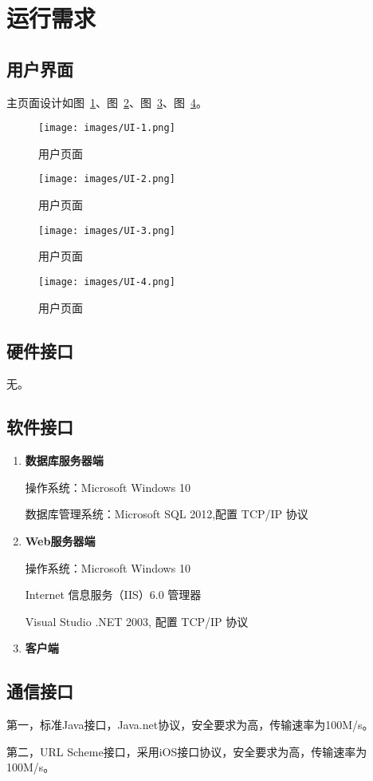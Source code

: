 \section{运行需求}
\subsection{用户界面}
主页面设计如图~\ref{fig:UI1}、图~\ref{fig:UI2}、图~\ref{fig:UI3}、图~\ref{fig:UI4}。

\begin{figure}[H]
 \centering
 \texttt{[image: images/UI-1.png]}
 \caption{
    用户页面
  }
 \label{fig:UI1}
 \vspace{-\medskipamount}
\end{figure}

\begin{figure}[H]
 \centering
 \texttt{[image: images/UI-2.png]}
 \caption{
    用户页面
  }
 \label{fig:UI2}
 \vspace{-\medskipamount}
\end{figure}

\begin{figure}[H]
 \centering
 \texttt{[image: images/UI-3.png]}
 \caption{
    用户页面
  }
 \label{fig:UI3}
 \vspace{-\medskipamount}
\end{figure}

\begin{figure}[H]
 \centering
 \texttt{[image: images/UI-4.png]}
 \caption{
    用户页面
  }
 \label{fig:UI4}
 \vspace{-\medskipamount}
\end{figure}
\subsection{硬件接口}
无。

\subsection{软件接口}
\begin{enumerate}
\item \textbf{数据库服务器端}

操作系统：Microsoft Windows 10

数据库管理系统：Microsoft SQL 2012,配置 TCP/IP 协议

\item \textbf{Web服务器端}

操作系统：Microsoft Windows 10

Internet 信息服务（IIS）6.0 管理器

Visual Studio .NET 2003, 配置 TCP/IP 协议

\item \textbf{客户端}

\end{enumerate}

\subsection{通信接口}
第一，标准Java接口，Java.net协议，安全要求为高，传输速率为100M/s。

第二，URL Scheme接口，采用iOS接口协议，安全要求为高，传输速率为100M/s。




